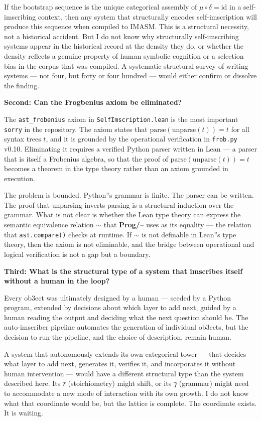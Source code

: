 \documentclass[12pt,a4paper]{article}
\begin{document}
If the bootstrap sequence is the unique categorical assembly of $\mu\circ\delta = \mathrm{id}$ in a self-imscribing context, then any system that structurally encodes self-imscription will produce this sequence when compiled to IMASM. This is a structural necessity, not a historical accident. But I do not know why structurally self-imscribing systems appear in the historical record at the density they do, or whether the density reflects a genuine property of human symbolic cognition or a selection bias in the corpus that was compiled. A systematic structural survey of writing systems --- not four, but forty or four hundred --- would either confirm or dissolve the finding.

\textbf{Second: Can the Frogbenius axiom be eliminated?}

The \texttt{ast\_frobenius} axiom in \texttt{SelfImscription.lean} is the most important \texttt{sorry} in the repository. The axiom states that $\text{parse}(\text{unparse}(t)) = t$ for all syntax trees $t$, and it is grounded by the operational verification in \texttt{frob.py} v0.10. Eliminating it requires a verified Python parser written in Lean --- a parser that is itself a Frobenius algebra, so that the proof of $\text{parse}(\text{unparse}(t)) = t$ becomes a theorem in the type theory rather than an axiom grounded in execution.

The problem is bounded. Python''s grammar is finite. The parser can be written. The proof that unparsing inverts parsing is a structural induction over the grammar. What is not clear is whether the Lean type theory can express the semantic equivalence relation $\sim$ that \textbf{Prog/\textasciitilde{}} uses as its equality --- the relation that \texttt{ast.compare()} checks at runtime. If $\sim$ is not definable in Lean''s type theory, then the axiom is not eliminable, and the bridge between operational and logical verification is not a gap but a boundary.

\textbf{Third: What is the structural type of a system that imscribes itself without a human in the loop?}

Every ob3ect was ultimately designed by a human --- seeded by a Python program, extended by decisions about which layer to add next, guided by a human reading the output and deciding what the next question should be. The auto-imscriber pipeline automates the generation of individual ob3ects, but the decision to run the pipeline, and the choice of description, remain human.

A system that autonomously extends its own categorical tower --- that decides what layer to add next, generates it, verifies it, and incorporates it without human intervention --- would have a different structural type than the system described here. Its $\text{𐑳}$ (stoichiometry) might shift, or its $\text{𐑠}$ (grammar) might need to accommodate a new mode of interaction with its own growth. I do not know what that coordinate would be, but the lattice is complete. The coordinate exists. It is waiting.
\end{document}
